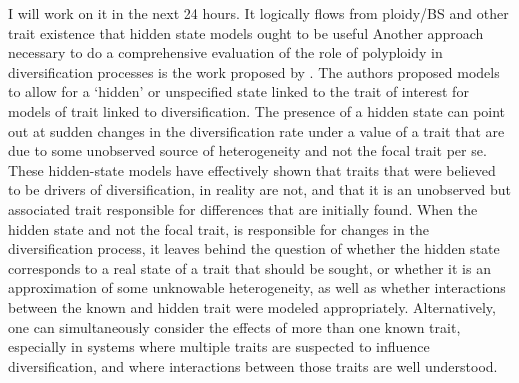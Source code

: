  I will work on it in the next 24 hours. It logically flows from ploidy/BS and other trait existence that hidden state models ought to be useful 
Another approach necessary to do a comprehensive evaluation of the role of polyploidy in diversification processes is the work proposed by \citet{beaulieu_2016}. 
The authors proposed models to  allow for a `hidden' or unspecified state linked to the trait of interest for models of trait linked to diversification. 
The presence of a hidden state can point out at sudden changes in the diversification rate under a value of a trait that are due to some unobserved source of heterogeneity and not the focal trait per se. 
These hidden-state  models have effectively shown that traits that were believed to be drivers of diversification, in reality are not, and that it is an unobserved but associated trait responsible for differences that are initially found.  
When the hidden state and not the focal trait, is responsible for changes in the diversification process, it leaves behind the question of whether the hidden state corresponds to a real state of a trait that should be sought, or whether it is an approximation of some unknowable heterogeneity, as well as whether interactions between the known and hidden trait were modeled appropriately.
Alternatively, one can simultaneously consider the effects of more than one known trait, especially in systems where multiple traits are suspected to influence diversification, and where interactions between those traits are well understood.

